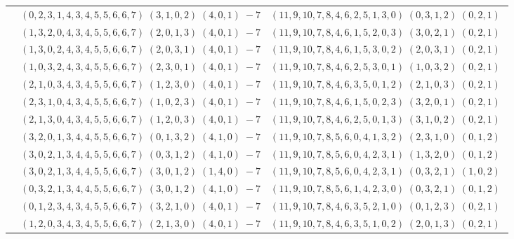 \documentclass[11pt]{article}
\begin{document}
\begin{longtable}[l]{|c|c|c|}
 \cline{2-3} 
 & $(0 ,2 ,3 ,1 ,4 ,3 ,4 ,5 ,5 ,6 ,6 ,7) \;(3 ,1 ,0 ,2) \;(4 ,0 ,1) \;-7$ & $(11 ,9 ,10 ,7 ,8 ,4 ,6 ,2 ,5 ,1 ,3 ,0) \;(0 ,3 ,1 ,2) \;(0 ,2 ,1) \;$\\ 
 \cline{2-3} 
 & $(1 ,3 ,2 ,0 ,4 ,3 ,4 ,5 ,5 ,6 ,6 ,7) \;(2 ,0 ,1 ,3) \;(4 ,0 ,1) \;-7$ & $(11 ,9 ,10 ,7 ,8 ,4 ,6 ,1 ,5 ,2 ,0 ,3) \;(3 ,0 ,2 ,1) \;(0 ,2 ,1) \;$\\ 
 \cline{2-3} 
 & $(1 ,3 ,0 ,2 ,4 ,3 ,4 ,5 ,5 ,6 ,6 ,7) \;(2 ,0 ,3 ,1) \;(4 ,0 ,1) \;-7$ & $(11 ,9 ,10 ,7 ,8 ,4 ,6 ,1 ,5 ,3 ,0 ,2) \;(2 ,0 ,3 ,1) \;(0 ,2 ,1) \;$\\ 
 \cline{2-3} 
 & $(1 ,0 ,3 ,2 ,4 ,3 ,4 ,5 ,5 ,6 ,6 ,7) \;(2 ,3 ,0 ,1) \;(4 ,0 ,1) \;-7$ & $(11 ,9 ,10 ,7 ,8 ,4 ,6 ,2 ,5 ,3 ,0 ,1) \;(1 ,0 ,3 ,2) \;(0 ,2 ,1) \;$\\ 
 \cline{2-3} 
 & $(2 ,1 ,0 ,3 ,4 ,3 ,4 ,5 ,5 ,6 ,6 ,7) \;(1 ,2 ,3 ,0) \;(4 ,0 ,1) \;-7$ & $(11 ,9 ,10 ,7 ,8 ,4 ,6 ,3 ,5 ,0 ,1 ,2) \;(2 ,1 ,0 ,3) \;(0 ,2 ,1) \;$\\ 
 \cline{2-3} 
 & $(2 ,3 ,1 ,0 ,4 ,3 ,4 ,5 ,5 ,6 ,6 ,7) \;(1 ,0 ,2 ,3) \;(4 ,0 ,1) \;-7$ & $(11 ,9 ,10 ,7 ,8 ,4 ,6 ,1 ,5 ,0 ,2 ,3) \;(3 ,2 ,0 ,1) \;(0 ,2 ,1) \;$\\ 
 \cline{2-3} 
 & $(2 ,1 ,3 ,0 ,4 ,3 ,4 ,5 ,5 ,6 ,6 ,7) \;(1 ,2 ,0 ,3) \;(4 ,0 ,1) \;-7$ & $(11 ,9 ,10 ,7 ,8 ,4 ,6 ,2 ,5 ,0 ,1 ,3) \;(3 ,1 ,0 ,2) \;(0 ,2 ,1) \;$\\ 
 \cline{2-3} 
 & $(3 ,2 ,0 ,1 ,3 ,4 ,4 ,5 ,5 ,6 ,6 ,7) \;(0 ,1 ,3 ,2) \;(4 ,1 ,0) \;-7$ & $(11 ,9 ,10 ,7 ,8 ,5 ,6 ,0 ,4 ,1 ,3 ,2) \;(2 ,3 ,1 ,0) \;(0 ,1 ,2) \;$\\ 
 \cline{2-3} 
 & $(3 ,0 ,2 ,1 ,3 ,4 ,4 ,5 ,5 ,6 ,6 ,7) \;(0 ,3 ,1 ,2) \;(4 ,1 ,0) \;-7$ & $(11 ,9 ,10 ,7 ,8 ,5 ,6 ,0 ,4 ,2 ,3 ,1) \;(1 ,3 ,2 ,0) \;(0 ,1 ,2) \;$\\ 
 \cline{2-3} 
 & $(3 ,0 ,2 ,1 ,3 ,4 ,4 ,5 ,5 ,6 ,6 ,7) \;(3 ,0 ,1 ,2) \;(1 ,4 ,0) \;-7$ & $(11 ,9 ,10 ,7 ,8 ,5 ,6 ,0 ,4 ,2 ,3 ,1) \;(0 ,3 ,2 ,1) \;(1 ,0 ,2) \;$\\ 
 \cline{2-3} 
 & $(0 ,3 ,2 ,1 ,3 ,4 ,4 ,5 ,5 ,6 ,6 ,7) \;(3 ,0 ,1 ,2) \;(4 ,1 ,0) \;-7$ & $(11 ,9 ,10 ,7 ,8 ,5 ,6 ,1 ,4 ,2 ,3 ,0) \;(0 ,3 ,2 ,1) \;(0 ,1 ,2) \;$\\ 
 \cline{2-3} 
 & $(0 ,1 ,2 ,3 ,4 ,3 ,4 ,5 ,5 ,6 ,6 ,7) \;(3 ,2 ,1 ,0) \;(4 ,0 ,1) \;-7$ & $(11 ,9 ,10 ,7 ,8 ,4 ,6 ,3 ,5 ,2 ,1 ,0) \;(0 ,1 ,2 ,3) \;(0 ,2 ,1) \;$\\ 
 \cline{2-3} 
 & $(1 ,2 ,0 ,3 ,4 ,3 ,4 ,5 ,5 ,6 ,6 ,7) \;(2 ,1 ,3 ,0) \;(4 ,0 ,1) \;-7$ & $(11 ,9 ,10 ,7 ,8 ,4 ,6 ,3 ,5 ,1 ,0 ,2) \;(2 ,0 ,1 ,3) \;(0 ,2 ,1) \;$\\ 

\end{longtable}
\end{document}
